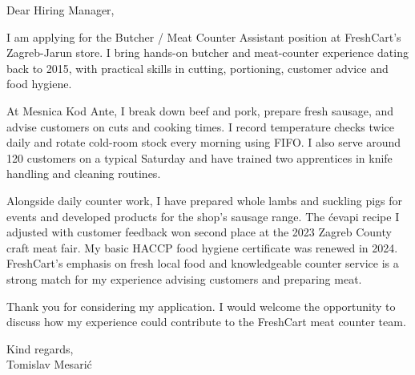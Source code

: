 \documentclass[11pt,a4paper]{article}
\begin{document}
Dear Hiring Manager,

I am applying for the Butcher / Meat Counter Assistant position at FreshCart’s Zagreb-Jarun store. I bring hands-on butcher and meat-counter experience dating back to 2015, with practical skills in cutting, portioning, customer advice and food hygiene.

At Mesnica Kod Ante, I break down beef and pork, prepare fresh sausage, and advise customers on cuts and cooking times. I record temperature checks twice daily and rotate cold-room stock every morning using FIFO. I also serve around 120 customers on a typical Saturday and have trained two apprentices in knife handling and cleaning routines.

Alongside daily counter work, I have prepared whole lambs and suckling pigs for events and developed products for the shop’s sausage range. The ćevapi recipe I adjusted with customer feedback won second place at the 2023 Zagreb County craft meat fair. My basic HACCP food hygiene certificate was renewed in 2024. FreshCart’s emphasis on fresh local food and knowledgeable counter service is a strong match for my experience advising customers and preparing meat.

Thank you for considering my application. I would welcome the opportunity to discuss how my experience could contribute to the FreshCart meat counter team.

Kind regards,\\
Tomislav Mesarić
\end{document}
